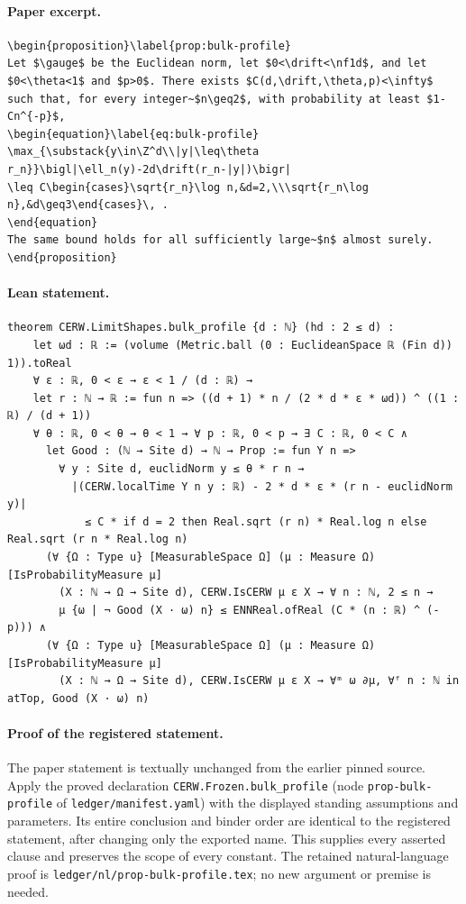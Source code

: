 \paragraph{Paper excerpt.}
\begin{verbatim}
\begin{proposition}\label{prop:bulk-profile}
Let $\gauge$ be the Euclidean norm, let $0<\drift<\nf1d$, and let $0<\theta<1$ and $p>0$. There exists $C(d,\drift,\theta,p)<\infty$ such that, for every integer~$n\geq2$, with probability at least $1-Cn^{-p}$,
\begin{equation}\label{eq:bulk-profile}
\max_{\substack{y\in\Z^d\\|y|\leq\theta r_n}}\bigl|\ell_n(y)-2d\drift(r_n-|y|)\bigr|
\leq C\begin{cases}\sqrt{r_n}\log n,&d=2,\\\sqrt{r_n\log n},&d\geq3\end{cases}\, .
\end{equation}
The same bound holds for all sufficiently large~$n$ almost surely.
\end{proposition}
\end{verbatim}
\paragraph{Lean statement.}
\begin{verbatim}
theorem CERW.LimitShapes.bulk_profile {d : ℕ} (hd : 2 ≤ d) :
    let ωd : ℝ := (volume (Metric.ball (0 : EuclideanSpace ℝ (Fin d)) 1)).toReal
    ∀ ε : ℝ, 0 < ε → ε < 1 / (d : ℝ) →
    let r : ℕ → ℝ := fun n => ((d + 1) * n / (2 * d * ε * ωd)) ^ ((1 : ℝ) / (d + 1))
    ∀ θ : ℝ, 0 < θ → θ < 1 → ∀ p : ℝ, 0 < p → ∃ C : ℝ, 0 < C ∧
      let Good : (ℕ → Site d) → ℕ → Prop := fun Y n =>
        ∀ y : Site d, euclidNorm y ≤ θ * r n →
          |(CERW.localTime Y n y : ℝ) - 2 * d * ε * (r n - euclidNorm y)|
            ≤ C * if d = 2 then Real.sqrt (r n) * Real.log n else Real.sqrt (r n * Real.log n)
      (∀ {Ω : Type u} [MeasurableSpace Ω] (μ : Measure Ω) [IsProbabilityMeasure μ]
        (X : ℕ → Ω → Site d), CERW.IsCERW μ ε X → ∀ n : ℕ, 2 ≤ n →
        μ {ω | ¬ Good (X · ω) n} ≤ ENNReal.ofReal (C * (n : ℝ) ^ (-p))) ∧
      (∀ {Ω : Type u} [MeasurableSpace Ω] (μ : Measure Ω) [IsProbabilityMeasure μ]
        (X : ℕ → Ω → Site d), CERW.IsCERW μ ε X → ∀ᵐ ω ∂μ, ∀ᶠ n : ℕ in atTop, Good (X · ω) n)
\end{verbatim}
\paragraph{Proof of the registered statement.}
The paper statement is textually unchanged from the earlier pinned source.
Apply the proved declaration \texttt{CERW.Frozen.bulk\_profile}
(node \texttt{prop-bulk-profile} of \texttt{ledger/manifest.yaml}) with the displayed
standing assumptions and parameters. Its entire conclusion and binder order
are identical to the registered statement, after changing only the exported
name. This supplies every asserted clause and preserves the scope of every
constant. The retained natural-language proof is
\texttt{ledger/nl/prop-bulk-profile.tex}; no new argument or premise is needed.
